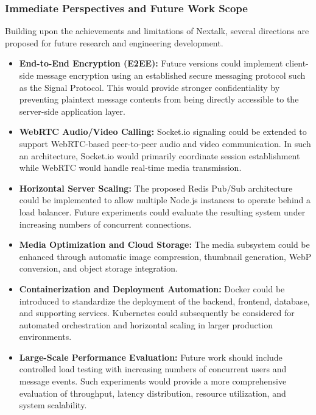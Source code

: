 \documentclass[12pt, a4paper]{article}
\begin{document}
\subsubsection{Immediate Perspectives and Future Work Scope}

Building upon the achievements and limitations of Nextalk, several directions are proposed for future research and engineering development.

\begin{itemize}

    \item
    \textbf{End-to-End Encryption (E2EE):}
    Future versions could implement client-side message encryption using an established secure messaging protocol such as the Signal Protocol. This would provide stronger confidentiality by preventing plaintext message contents from being directly accessible to the server-side application layer.

    \item
    \textbf{WebRTC Audio/Video Calling:}
    Socket.io signaling could be extended to support WebRTC-based peer-to-peer audio and video communication. In such an architecture, Socket.io would primarily coordinate session establishment while WebRTC would handle real-time media transmission.

    \item
    \textbf{Horizontal Server Scaling:}
    The proposed Redis Pub/Sub architecture could be implemented to allow multiple Node.js instances to operate behind a load balancer. Future experiments could evaluate the resulting system under increasing numbers of concurrent connections.

    \item
    \textbf{Media Optimization and Cloud Storage:}
    The media subsystem could be enhanced through automatic image compression, thumbnail generation, WebP conversion, and object storage integration.

    \item
    \textbf{Containerization and Deployment Automation:}
    Docker could be introduced to standardize the deployment of the backend, frontend, database, and supporting services. Kubernetes could subsequently be considered for automated orchestration and horizontal scaling in larger production environments.

    \item
    \textbf{Large-Scale Performance Evaluation:}
    Future work should include controlled load testing with increasing numbers of concurrent users and message events. Such experiments would provide a more comprehensive evaluation of throughput, latency distribution, resource utilization, and system scalability.

\end{itemize}
\end{document}
